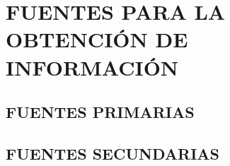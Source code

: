 \chapter{FUENTES PARA LA OBTENCI\'ON DE INFORMACI\'ON}
\section{FUENTES PRIMARIAS}
\section{FUENTES SECUNDARIAS}